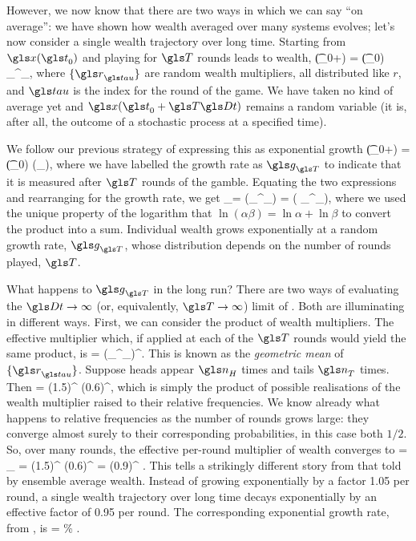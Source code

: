 However, we now know that there are two ways in which we can say ``on average'': we have shown how wealth averaged over many systems evolves; let's now consider a single wealth trajectory over long time. Starting from $\x(\t_0)$ and playing for $\T$ rounds leads to wealth,
\be
\x(\t_0+\T\Dt) = \x(\t_0) \prod_{}^\T \gr_\gtau,
\ee
where $\{\gr_\gtau\}$ are random wealth multipliers, all distributed like $r$, and $\gtau$ is the index for the round of the game. We have taken no kind of average yet and $\x(\t_0+\T\Dt)$ remains a random variable (it is, after all, the outcome of a stochastic process at a specified time).

We follow our previous strategy of expressing this as exponential growth
\be
\x(\t_0+\Dt) = \x(\t_0) \exp(\g_\T\Dt),
\ee
where we have labelled the growth rate as $\g_\T$ to indicate that it is measured after $\T$ rounds of the gamble. Equating the two expressions and rearranging for the growth rate, we get
\be
\g_\T =  \ln\left(\prod_{}^\T \gr_\gtau\right) =  \left( \sum_{}^\T \ln\gr_\gtau\right),
\ee
where we used the unique property of the logarithm that $\ln(\alpha\beta) = \ln\alpha + \ln\beta$ to convert the product into a sum. Individual wealth grows exponentially at a random growth rate, $\g_\T$, whose distribution depends on the number of rounds played, $\T$.

What happens to $\g_\T$ in the long run? There are two ways of evaluating the $\Dt\to\infty$ (or, equivalently, $\T\to\infty$) limit of . Both are illuminating in different ways. First, we can consider the product of wealth multipliers. The effective multiplier which, if applied at each of the $\T$ rounds would yield the same product, is
\be
\greff = \left(\prod_{}^\T \gr_\gtau\right)^.
\ee
This is known as the \textit{geometric mean} of $\{\gr_\gtau\}$. Suppose heads appear $\gn_H$ times and tails $\gn_T$ times. Then
\be
\greff = (1.5)^ (0.6)^,
\ee
which is simply the product of possible realisations of the wealth multiplier raised to their relative frequencies. We know already what happens to relative frequencies as the number of rounds grows large: they converge almost surely to their corresponding probabilities, in this case both $1/2$. So, over many rounds, the effective per-round multiplier of wealth converges to
\be
\grtime = \lim_{\T\to\infty} \greff = (1.5)^ (0.6)^ = (0.9)^  .
\ee
This tells a strikingly different story from that told by ensemble average wealth. Instead of growing exponentially by a factor 1.05 per round, a single wealth trajectory over long time decays exponentially by an effective factor of 0.95 per round. The corresponding exponential growth rate, from , is
\be
\ggtime = \frac{\ln\grtime}{\dt} \% .
\ee


